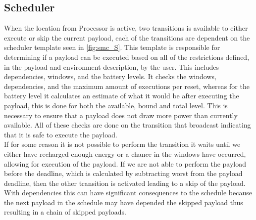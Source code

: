 \subsection{Scheduler}
When the location  from Processor is active, two transitions is available to either execute or skip the current payload, each of the transitions are dependent on the scheduler template seen in \cref{fig:smc_S}. This template is responsible for determining if a payload can be executed based on all of the restrictions defined, in the payload and environment description, by the user. This includes dependencies, windows, and the battery levels. It checks the windows, dependencies, and the maximum amount of executions per reset, whereas for the battery level it calculates an estimate of what it would be after executing the payload, this is done for both the available, bound and total level.
This is necessary to ensure that a payload does not draw more power than currently available. All of these checks are done on the transition that broadcast  indicating that it is safe to execute the payload. \\
If for some reason it is not possible to perform the transition it waits until we either have recharged enough energy or a chance in the windows have occurred, allowing for execution of the payload. If we are not able to perform the payload before the deadline, which is calculated by subtracting worst from the payload deadline, then the other transition is activated leading to a skip of the payload. With dependencies this can have significant consequences to the schedule because the next payload in the schedule may have depended the skipped payload thus resulting in a chain of skipped payloads.


